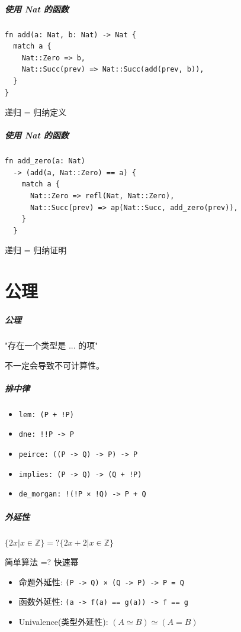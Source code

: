 \documentclass[UTF-8]{ctexbeamer}
\begin{document}
\begin{frame}[fragile]
  \frametitle{使用 Nat 的函数}

  \begin{verbatim}
fn add(a: Nat, b: Nat) -> Nat {
  match a {
    Nat::Zero => b,
    Nat::Succ(prev) => Nat::Succ(add(prev, b)),
  }
}
  \end{verbatim}

  \pause

  递归 = 归纳定义
\end{frame}

\begin{frame}[fragile]
  \frametitle{使用 Nat 的函数}
  \begin{verbatim}
fn add_zero(a: Nat)
  -> (add(a, Nat::Zero) == a) {
    match a {
      Nat::Zero => refl(Nat, Nat::Zero),
      Nat::Succ(prev) => ap(Nat::Succ, add_zero(prev)),
    }
  }
  \end{verbatim}
  \pause

  递归 = 归纳证明
\end{frame}

\part{公理}
\frame{\partpage}

\begin{frame}
  \frametitle{公理}

  "存在一个类型是 ... 的项"

  \pause

  不一定会导致不可计算性。
\end{frame}

\begin{frame}
  \frametitle{排中律}

  \begin{itemize}
    \item \texttt{lem: (P + !P)}
    \item \texttt{dne: !!P -> P}
    \item \texttt{peirce: ((P -> Q) -> P) -> P}
    \item \texttt{implies: (P -> Q) -> (Q + !P)}
    \item \texttt{de\_morgan: !(!P × !Q) -> P + Q}
  \end{itemize}
\end{frame}

\begin{frame}
  \frametitle{外延性}

  $\{2x | x \in \mathbb{Z}\} =? \{2x + 2 | x \in \mathbb{Z}\}$
  \pause

  简单算法 =? 快速幂

  \pause

  \begin{itemize}
    \item 命题外延性: \texttt{(P -> Q) × (Q -> P) -> P = Q}
    \pause
    \item 函数外延性: \texttt{(a -> f(a) == g(a)) -> f == g}
    \pause
    \item Univalence(类型外延性): $(A \simeq B) \simeq (A = B)$
  \end{itemize}
\end{frame}
\end{document}
